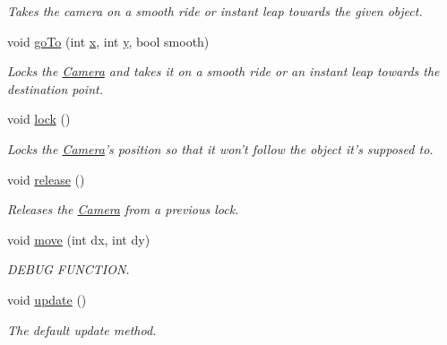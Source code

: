 \begin{DoxyCompactItemize}
\begin{DoxyCompactList}\small\item\em Takes the camera on a smooth ride or instant leap towards the given object. \end{DoxyCompactList}\item 
void \hyperlink{class_camera_ae2a9b21471f91f559f99023fab5d8601}{go\-To} (int \hyperlink{class_camera_ae270fbd3b09b36f240a2d55b3b5b9cec}{x}, int \hyperlink{class_camera_ab0522c72fc25c7fa9ad6d0b91e0a3270}{y}, bool smooth)
\begin{DoxyCompactList}\small\item\em Locks the \hyperlink{class_camera}{Camera} and takes it on a smooth ride or an instant leap towards the destination point. \end{DoxyCompactList}\item 
void \hyperlink{class_camera_ae03c5b5d99889b54a8014129228d59e7}{lock} ()
\begin{DoxyCompactList}\small\item\em Locks the \hyperlink{class_camera}{Camera}'s position so that it won't follow the object it's supposed to. \end{DoxyCompactList}\item 
void \hyperlink{class_camera_ab26419a3af317221e08061e3106f8693}{release} ()
\begin{DoxyCompactList}\small\item\em Releases the \hyperlink{class_camera}{Camera} from a previous lock. \end{DoxyCompactList}\item 
void \hyperlink{class_camera_ad8f06bc68acea4df03ec87a23c888af8}{move} (int dx, int dy)
\begin{DoxyCompactList}\small\item\em D\-E\-B\-U\-G F\-U\-N\-C\-T\-I\-O\-N. \end{DoxyCompactList}\item 
void \hyperlink{class_camera_a42cda7239981a5618660d04bd5893556}{update} ()
\begin{DoxyCompactList}\small\item\em The default update method. \end{DoxyCompactList}\end{DoxyCompactItemize}
